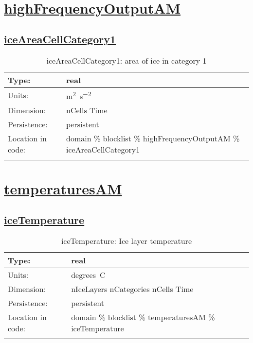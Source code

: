 \section[highFrequencyOutputAM]{\hyperref[sec:var_tab_highFrequencyOutputAM]{highFrequencyOutputAM}}
\label{sec:var_sec_highFrequencyOutputAM}
\subsection[iceAreaCellCategory1]{\hyperref[sec:var_tab_highFrequencyOutputAM]{iceAreaCellCategory1}}
\label{subsec:var_sec_highFrequencyOutputAM_iceAreaCellCategory1}
\begin{center}
\begin{longtable}{| p{2.0in} | p{4.0in} |}
        \hline 
        Type: & real \\
        \hline 
        Units: & \si{m^2.s^{-2}} \\
        \hline 
        Dimension: & nCells Time \\
        \hline 
        Persistence: & persistent \\
        \hline 
         Location in code: & domain \% blocklist \% highFrequencyOutputAM \% iceAreaCellCategory1 \\
         \hline 
    \caption{iceAreaCellCategory1: area of ice in category 1}
\end{longtable}
\end{center}
\section[temperaturesAM]{\hyperref[sec:var_tab_temperaturesAM]{temperaturesAM}}
\label{sec:var_sec_temperaturesAM}
\subsection[iceTemperature]{\hyperref[sec:var_tab_temperaturesAM]{iceTemperature}}
\label{subsec:var_sec_temperaturesAM_iceTemperature}
\begin{center}
\begin{longtable}{| p{2.0in} | p{4.0in} |}
        \hline 
        Type: & real \\
        \hline 
        Units: & \si{degrees.C} \\
        \hline 
        Dimension: & nIceLayers nCategories nCells Time \\
        \hline 
        Persistence: & persistent \\
        \hline 
         Location in code: & domain \% blocklist \% temperaturesAM \% iceTemperature \\
         \hline 
    \caption{iceTemperature: Ice layer temperature}
\end{longtable}
\end{center}
